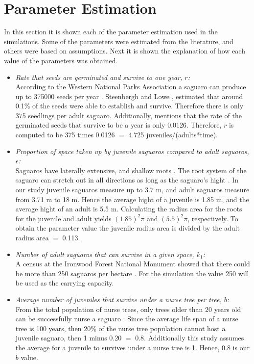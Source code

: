 \documentclass[a4paper]{article}
\begin{document}
\section{Parameter Estimation}
In this section it is shown each of the parameter estimation used in the simulations. Some of the parameters were estimated from the literature, and others were based on assumptions. Next it is shown the explanation of how each value of the parameters was obtained.\\
\begin{itemize}
\item \textit{Rate that seeds are germinated and survive to one year, $r$:}\\
According to the Western National Parks Association a saguaro can produce up to 375000 seeds per year \cite{saguaroInformative}. Steenbergh and Lowe \cite{steenbergh1977ecology}, estimated that around 0.1\% of the seeds were able to establish and survive. Therefore there is only 375 seedlings per adult saguaro. Additionally, \cite{EcofSaguaro} mentions that the rate of the germinated seeds that survive to be a year is only 0.0126. Therefore, $r$ is computed to be 375 times 0.0126 $=$ 4.725 juveniles/(adults*time).
\item \textit{Proportion of space taken up by juvenile saguaros compared to adult saguaros, $\epsilon$:}\\
Saguaros have laterally extensive, and shallow roots \cite{Drezner2014}. The root system of the saguaro can stretch out in all directions as long as the saguaro's hight \cite{NPSsaguaroRoots}. In our study juvenile saguaros measure up to 3.7 m, and adult saguaros measure from 3.71 m to 18 m. Hence the average hight of a juvenile is 1.85 m, and the average hight of an adult is 5.5 m. Calculating the radius area for the roots for the juvenile and adult yields $(1.85)^2\pi$ and $(5.5)^2\pi$, respectively. To obtain the parameter value the juvenile radius area is divided by the adult radius area $=$ 0.113.
\item \textit{Number of adult saguaros that can survive in a given space, $k_1$:}\\
A census at the Ironwood Forest National Monument showed that there could be more than 250 saguaros per hectare \cite{A-SdesertMuseum}. For the simulation the value 250 will be used as the carrying capacity.

\item \textit{Average number of juveniles that survive under a nurse tree per tree, $b$:}\\
From the total population of nurse trees, only trees older than 20 years old can be successfully nurse a saguaro \cite{Bashan2009}. Since the average life span of a nurse tree is 100 years, then 20\% of the nurse tree population cannot host a juvenile saguaro, then 1 minus 0.20 $=$ 0.8. Additionally this study assumes the average for a juvenile to survives under a nurse tree is 1. Hence, 0.8 is our $b$ value.


\end{itemize}
\end{document}
